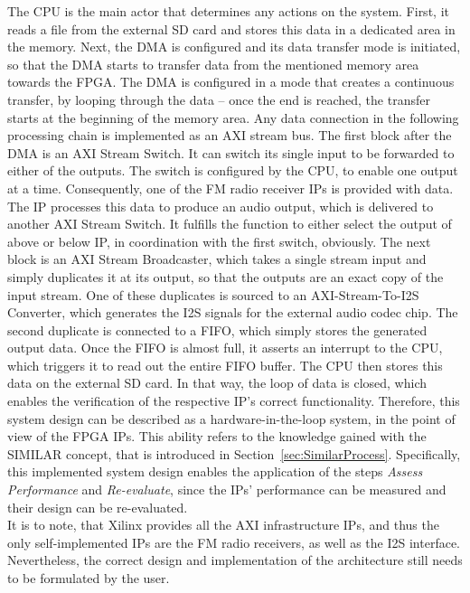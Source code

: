 The CPU is the main actor that determines any actions on the system.
First, it reads a file from the external SD card and stores this data in a dedicated area in the memory.
Next, the DMA is configured and its data transfer mode is initiated, so that the DMA starts to transfer data from the mentioned memory area towards the FPGA.
The DMA is configured in a mode that creates a continuous transfer, by looping through the data -- once the end is reached, the transfer starts at the beginning of the memory area.
Any data connection in the following processing chain is implemented as an AXI stream bus.
The first block after the DMA is an AXI Stream Switch.
It can switch its single input to be forwarded to either of the outputs.
The switch is configured by the CPU, to enable one output at a time.
Consequently, one of the FM radio receiver IPs is provided with data.
The IP processes this data to produce an audio output, which is delivered to another AXI Stream Switch.
It fulfills the function to either select the output of above or below IP, in coordination with the first switch, obviously.
The next block is an AXI Stream Broadcaster, which takes a single stream input and simply duplicates it at its output, so that the outputs are an exact copy of the input stream.
One of these duplicates is sourced to an AXI-Stream-To-I2S Converter, which generates the I2S signals for the external audio codec chip.
The second duplicate is connected to a FIFO, which simply stores the generated output data.
Once the FIFO is almost full, it asserts an interrupt to the CPU, which triggers it to read out the entire FIFO buffer.
The CPU then stores this data on the external SD card.
In that way, the loop of data is closed, which enables the verification of the respective IP's correct functionality.
Therefore, this system design can be described as a hardware-in-the-loop system, in the point of view of the FPGA IPs.
This ability refers to the knowledge gained with the SIMILAR concept, that is introduced in Section~\ref{sec:SimilarProcess}.
Specifically, this implemented system design enables the application of the steps \textit{Assess Performance} and \textit{Re-evaluate}, since the IPs' performance can be measured and their design can be re-evaluated.\\

It is to note, that Xilinx provides all the AXI infrastructure IPs, and thus the only self-implemented IPs are the FM radio receivers, as well as the I2S interface.
Nevertheless, the correct design and implementation of the architecture still needs to be formulated by the user.

